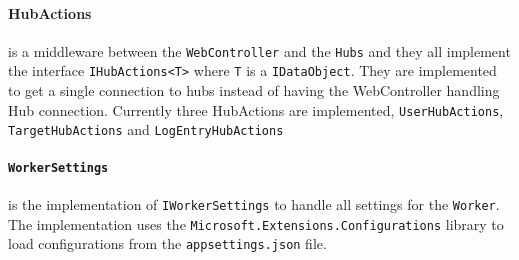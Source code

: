 \documentclass{article}
\begin{document}
\paragraph{HubActions} is a middleware between the \texttt{WebController} and the \texttt{Hubs} and they all implement the interface \texttt{IHubActions<T>} where \texttt{T} is a \texttt{IDataObject}. They are implemented to get a single connection to hubs instead of having the WebController handling Hub connection. Currently three HubActions are implemented, \texttt{UserHubActions}, \texttt{TargetHubActions} and \texttt{LogEntryHubActions}

\paragraph{\texttt{WorkerSettings}} is the implementation of \texttt{IWorkerSettings} to handle all settings for the \texttt{Worker}. The implementation uses the \texttt{Microsoft.Extensions.Configurations} library to load configurations from the \texttt{appsettings.json} file.
\end{document}
